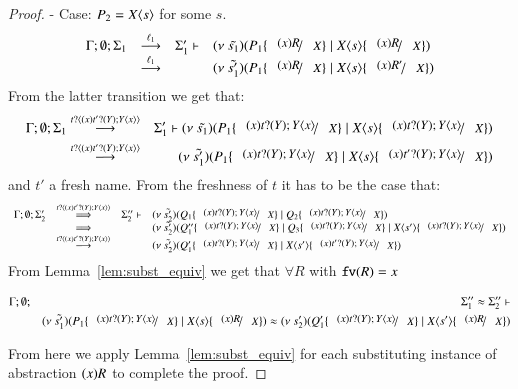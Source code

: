 \begin{proof}
	\noi - Case: $P_2 = X\langle s \rangle$ for some $s$.
%
	\[
	\begin{array}{rcll}
		\Gamma; \es; \Sigma_1 &\by{\ell_1}& \Sigma_1' \proves& \newsp{\tilde{s_1}}{P_1 \subst{(x) R}{X} \Par \appl{X}{s} \subst{(x) R}{X}}\\
		&\by{\ell_1} & & \newsp{\tilde{s_1'}}{P_1 \subst{(x) R}{X} \Par \appl{X}{s} \subst{(x) R'}{X}}
	\end{array}
	\]
%
	\noi From the latter transition we get that:
%
	\begin{eqnarray}
		\Gamma; \es; \Sigma_1 &\by{\bactinp{t}{(x) \binp{t'}{Y} \appl{Y}{x}}}& \Sigma_1' \proves \newsp{\tilde{s_1}}{P_1 \subst{(x) \binp{t}{Y} \appl{Y}{x}}{X} \Par \appl{X}{s} \subst{(x) \binp{t}{Y} \appl{Y}{x}}{X}}\\
		&\by{\bactinp{t}{(x) \binp{t'}{Y} \appl{Y}{x}}}& 
		\newsp{\tilde{s_1'}}{P_1 \subst{(x) \binp{t}{Y} \appl{Y}{x}}{X} \Par \appl{X}{s} \subst{(x) \binp{t'}{Y} \appl{Y}{x}}{X}}
		\label{cor:subst_equiv5}
	\end{eqnarray}
%
	\noi and $t'$ a fresh name. From the freshness of $t$
	it has to be the case that:
%
\[
	\begin{array}{rcll}
		\Gamma; \es; \Sigma_2' &\By{\bactinp{t}{(x) \binp{t'}{Y} \appl{Y}{x}}}& \Sigma_2'' \proves &
		\newsp{\tilde{s_2'}}{Q_1 \subst{(x) \binp{t}{Y} \appl{Y}{x}}{X} \Par Q_2 \subst{(x) \binp{t}{Y} \appl{Y}{x}}{X}}\\
		&\By{}& &
		\newsp{\tilde{s_2'}}{Q_1'' \subst{(x) \binp{t}{Y} \appl{Y}{x}}{X} \Par Q_3 \subst{(x) \binp{t}{Y} \appl{Y}{x}}{X} \Par \appl{X}{s'} \subst{(x)\binp{t}{Y} \appl{Y}{x}}{X}} \\
		&\by{\bactinp{t}{(x) \binp{t'}{Y} \appl{Y}{x}}}& &
		\newsp{\tilde{s_2'}}{Q_1'\subst{(x) \binp{t}{Y} \appl{Y}{x}}{X} \Par \appl{X}{s'} \subst{(x)\binp{t'}{Y} \appl{Y}{x}}{X}} \\
	\end{array}
\]
%
	\noi From Lemma~\ref{lem:subst_equiv} we get that $\forall R$ with $\mathtt{fv}(R) = x$

	\begin{eqnarray}
		\Gamma; \es; &&\Sigma_1'' \wb \Sigma_2'' \proves \\
		&&\newsp{\tilde{s_1'}}{P_1 \subst{(x) \binp{t}{Y} \appl{Y}{x}}{X} \Par \appl{X}{s} \subst{(x) R}{X}} \wb \newsp{s_2'}{Q_1' \subst{(x) \binp{t}{Y} \appl{Y}{x}}{X} \Par \appl{X}{s'} \subst{(x) R}{X}}
		\label{cor:subst_equiv6}
	\end{eqnarray} 

	\noi From here we apply Lemma~\ref{lem:subst_equiv} for each substituting instance of
	abstraction $(x)R$ to complete the proof.
\end{proof}


